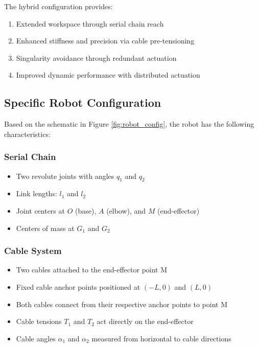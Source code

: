 \documentclass[11pt,a4paper]{article}
\begin{document}
The hybrid configuration provides:
\begin{enumerate}
    \item Extended workspace through serial chain reach
    \item Enhanced stiffness and precision via cable pre-tensioning  
    \item Singularity avoidance through redundant actuation
    \item Improved dynamic performance with distributed actuation
\end{enumerate}

\subsection{Specific Robot Configuration}
Based on the schematic in Figure \ref{fig:robot_config}, the robot has the following characteristics:

\subsubsection{Serial Chain}
\begin{itemize}
    \item Two revolute joints with angles $q_1$ and $q_2$
    \item Link lengths: $l_1$ and $l_2$  
    \item Joint centers at $O$ (base), $A$ (elbow), and $M$ (end-effector)
    \item Centers of mass at $G_1$ and $G_2$
\end{itemize}

\subsubsection{Cable System}
\begin{itemize}
    \item Two cables attached to the end-effector point M
    \item Fixed cable anchor points positioned at $(-L, 0)$ and $(L, 0)$ 
    \item Both cables connect from their respective anchor points to point M
    \item Cable tensions $T_1$ and $T_2$ act directly on the end-effector
    \item Cable angles $\alpha_1$ and $\alpha_2$ measured from horizontal to cable directions
\end{itemize}
\end{document}
